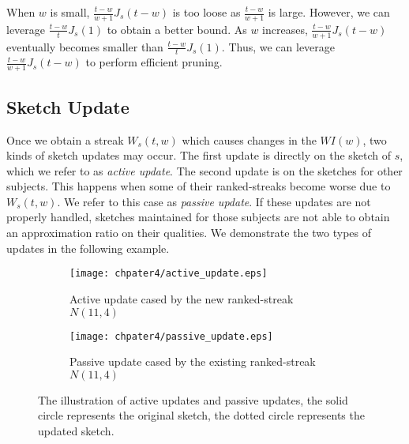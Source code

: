 When $w$ is small, $\frac{t-w}{w+1}J_s(t-w)$ is too loose as $\frac{t-w}{w+1}$ is large. However, we can leverage $\frac{t-w}{t}J_s(1)$ to obtain a better bound. As $w$ increases, $\frac{t-w}{w+1}J_s(t-w)$ eventually becomes smaller than $\frac{t-w}{t}J_s(1)$. Thus, we can leverage $\frac{t-w}{w+1}J_s(t-w)$ to perform efficient pruning. 


\subsection{Sketch Update}
\label{subsec:sketch_main}
Once we obtain a streak $W_s(t,w)$ which causes changes in the $WI(w)$, 
two kinds of sketch updates may occur. The first update is directly
on the sketch of $s$,
which we refer to as \emph{active update}.
The second update is on the sketches for other subjects. 
This happens when some of their ranked-streaks become worse due to $W_s(t,w)$. 
We refer to this case as \emph{passive update}. If these 
updates are not properly handled, sketches maintained for those subjects 
are not able to obtain an approximation ratio on their qualities. 
We demonstrate the two types of updates in the following example.

\begin{figure}[h]
	\centering
    \begin{subfigure}[b]{0.453\textwidth}
        \texttt{[image: chpater4/active\_update.eps]}
        \caption{Active update cased by the new ranked-streak $N(11,4)$}
    \end{subfigure}
    \begin{subfigure}[b]{0.45\textwidth}
        \texttt{[image: chpater4/passive\_update.eps]}
        \caption{Passive update cased by the existing ranked-streak $N(11,4)$ }
    \end{subfigure}
    \caption{The illustration of active updates and passive updates, the solid circle represents the original
    sketch, the dotted circle represents the updated sketch.}
    \label{fig:sketch_maintenance}
\end{figure}


